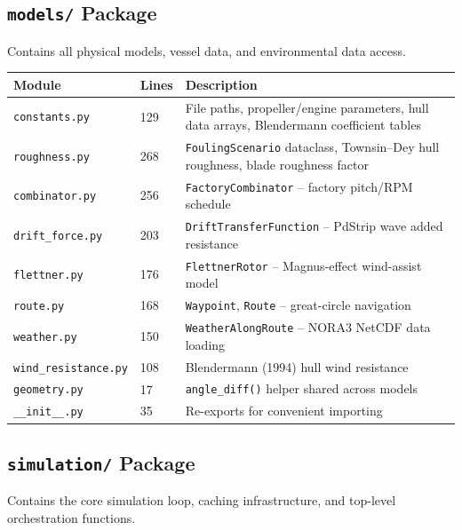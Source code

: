 \documentclass[a4paper,11pt]{article}
\begin{document}
\subsection{\texttt{models/} Package}
\label{sec:orgbfb070b}

Contains all physical models, vessel data, and environmental data access.

\begin{center}
\begin{tabular}{llp{8cm}}
\toprule
Module & Lines & Description\\[0pt]
\midrule
\texttt{constants.py} & 129 & File paths, propeller/engine parameters, hull data arrays, Blendermann coefficient tables\\[0pt]
\texttt{roughness.py} & 268 & \texttt{FoulingScenario} dataclass, Townsin--Dey hull roughness, blade roughness factor\\[0pt]
\texttt{combinator.py} & 256 & \texttt{FactoryCombinator} -- factory pitch/RPM schedule\\[0pt]
\texttt{drift\_force.py} & 203 & \texttt{DriftTransferFunction} -- PdStrip wave added resistance\\[0pt]
\texttt{flettner.py} & 176 & \texttt{FlettnerRotor} -- Magnus-effect wind-assist model\\[0pt]
\texttt{route.py} & 168 & \texttt{Waypoint}, \texttt{Route} -- great-circle navigation\\[0pt]
\texttt{weather.py} & 150 & \texttt{WeatherAlongRoute} -- NORA3 NetCDF data loading\\[0pt]
\texttt{wind\_resistance.py} & 108 & Blendermann (1994) hull wind resistance\\[0pt]
\texttt{geometry.py} & 17 & \texttt{angle\_diff()} helper shared across models\\[0pt]
\texttt{\_\_init\_\_.py} & 35 & Re-exports for convenient importing\\[0pt]
\bottomrule
\end{tabular}
\end{center}

\subsection{\texttt{simulation/} Package}
\label{sec:org9fc12dd}

Contains the core simulation loop, caching infrastructure, and top-level
orchestration functions.
\end{document}
